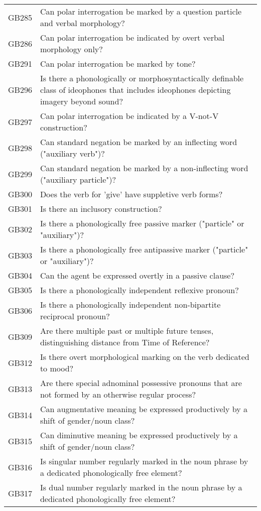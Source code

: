\begin{longtable}{p{3cm}p{12cm}}
  GB285 & Can polar interrogation be marked by a question particle and verbal morphology? \\ 
  GB286 & Can polar interrogation be indicated by overt verbal morphology only? \\ 
  GB291 & Can polar interrogation be marked by tone? \\ 
  GB296 & Is there a phonologically or morphosyntactically definable class of ideophones that includes ideophones depicting imagery beyond sound? \\ 
  GB297 & Can polar interrogation be indicated by a V-not-V construction? \\ 
  GB298 & Can standard negation be marked by an inflecting word ("auxiliary verb")? \\ 
  GB299 & Can standard negation be marked by a non-inflecting word ("auxiliary particle")? \\ 
  GB300 & Does the verb for 'give' have suppletive verb forms? \\ 
  GB301 & Is there an inclusory construction? \\ 
  GB302 & Is there a phonologically free passive marker ("particle" or "auxiliary")? \\ 
  GB303 & Is there a phonologically free antipassive marker ("particle" or "auxiliary")? \\ 
  GB304 & Can the agent be expressed overtly in a passive clause? \\ 
  GB305 & Is there a phonologically independent reflexive pronoun? \\ 
  GB306 & Is there a phonologically independent non-bipartite reciprocal pronoun? \\ 
  GB309 & Are there multiple past or multiple future tenses, distinguishing distance from Time of Reference? \\ 
  GB312 & Is there overt morphological marking on the verb dedicated to mood? \\ 
  GB313 & Are there special adnominal possessive pronouns that are not formed by an otherwise regular process? \\ 
  GB314 & Can augmentative meaning be expressed productively by a shift of gender/noun class? \\ 
  GB315 & Can diminutive meaning be expressed productively by a shift of gender/noun class? \\ 
  GB316 & Is singular number regularly marked in the noun phrase by a dedicated phonologically free element? \\ 
  GB317 & Is dual number regularly marked in the noun phrase by a dedicated phonologically free element? \\ 

\end{longtable}
